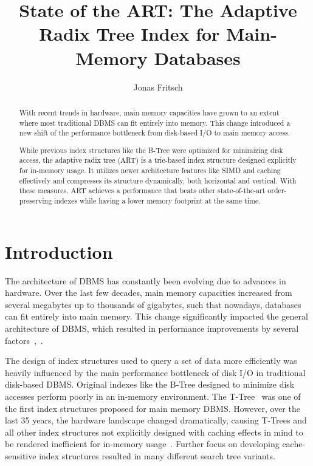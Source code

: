 \documentclass[acmtog, nonacm]{acmart}
\begin{document}
\title{State of the ART: The Adaptive Radix Tree Index for Main-Memory Databases}

\author{Jonas Fritsch}

\begin{abstract}
    With recent trends in hardware, main memory capacities have grown to an extent where most traditional DBMS 
    can fit entirely into memory. This change introduced a new shift of the performance bottleneck 
    from disk-based I/O to main memory access.
    
    While previous index structures like the B-Tree were optimized for minimizing disk access, the 
    adaptive radix tree (ART) is a trie-based index structure designed explicitly for in-memory usage. 
    It utilizes newer architecture features like SIMD and caching effectively and compresses its structure 
    dynamically, both horizontal and vertical. With these measures, ART achieves a performance that beats 
    other state-of-the-art order-preserving indexes while having a lower memory footprint at the same time.
\end{abstract}

\maketitle

\section{Introduction}

The architecture of DBMS has constantly been evolving due to advances in hardware. 
Over the last few decades, main memory capacities increased from several megabytes up to thousands 
of gigabytes, such that nowadays, databases can fit entirely into main memory. This change significantly 
impacted the general architecture of DBMS, which resulted in performance improvements 
by several factors~\cite{10.1145/1376616.1376713},~\cite{7097722}.

The design of index structures used to query a set of data more efficiently was heavily influenced 
by the main performance bottleneck of disk I/O in traditional disk-based DBMS. 
Original indexes like the B-Tree designed to minimize disk accesses perform poorly 
in an in-memory environment. 
The T-Tree~\cite{lehman1985study} was one of the first index structures proposed for main memory DBMS. 
However, over the last 35 years, the hardware landscape changed dramatically, causing T-Trees 
and all other index structures not explicitly designed with caching effects in mind to be rendered 
inefficient for in-memory usage~\cite{rao1998cache}. Further focus on developing cache-sensitive index structures resulted in many 
different search tree variants.
\end{document}
